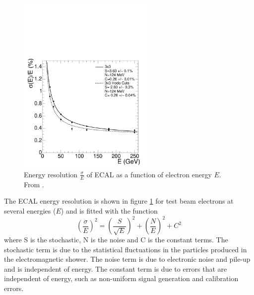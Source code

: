 \begin{figure}[htbp]
  \centering
  \includegraphics[width=0.6\textwidth]{ecal_performance}
  \caption{Energy resolution $\frac{\sigma}{E}$ of ECAL as a function of
  \label{fig:ECAL}
electron energy $E$. From \cite{cms}.}
\end{figure}

The ECAL energy resolution is shown in figure \ref{fig:ECAL} for test beam
electrons at several energies ($E$) and is fitted with the function
\begin{equation}
\left(\frac{\sigma}{E}\right)^{2} = \left(\frac{S}{\sqrt{E}}\right)^{2} +
\left(\frac{N}{E}\right)^{2} + C^{2}
\end{equation}
where S is the stochastic, N is the noise and C is the constant terms. The
stochastic term is due to the statistical fluctuations in the particles
produced in the electromagnetic shower. The noise term is due to electronic
noise and pile-up and is independent of energy. The constant term is due to
errors that are independent of energy, such as non-uniform signal generation
and calibration errors.\cite{cms}





